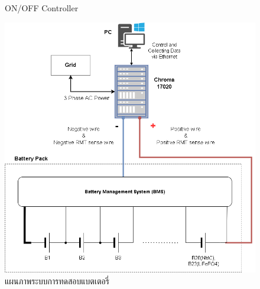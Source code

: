 \begin{center}
\begin{figure}[H]
			\caption{ON/OFF Controller}
	\end{figure}
\begin{figure}[!h]
	\includegraphics[width=1\linewidth]{Chapters/img/Testing_System.png}
		\centering
		\captionsetup{justification=centering,margin=2cm}
		\caption{แผนภาพระบบการทดสอบแบตเตอรี่}
	\end{figure}
\end{center}
\vfill
